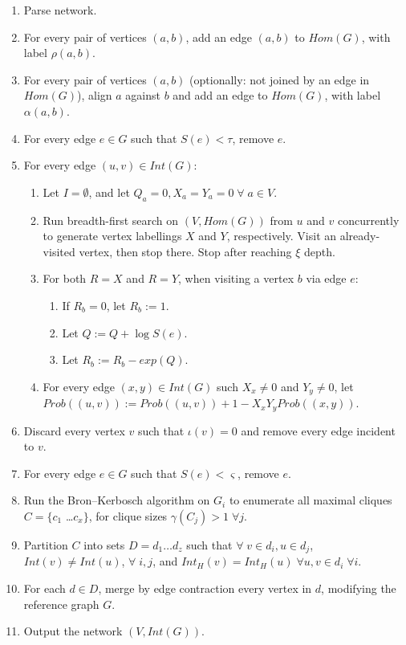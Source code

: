 \documentclass[12pt,twoside]{article}
\def\NS{
	\setlength{\itemsep}{0.1em}
	\setlength{\parskip}{0em}
	\setlength{\parsep}{0em}
}
\begin{document}
\begin{enumerate}
\NS
\item Parse network.
\item For every pair of vertices $(a,b)$, add an edge $(a,b)$ to $Hom(G)$, with label $\rho(a,b)$.
\item For every pair of vertices $(a,b)$ (optionally: not joined by an edge in $Hom(G)$), align $a$ against $b$ and add an edge to $Hom(G)$, with label $\alpha(a,b)$.
\item For every edge $e \in G$ such that $S(e) < \tau$, remove $e$.
\item For every edge $(u,v) \in Int(G)$:
\begin{enumerate}
\item Let $I=\emptyset$, and let $Q_a = 0, X_a = Y_a = 0 \; \forall \; a \in V$.
\item Run breadth-first search on $(V, Hom(G))$ from $u$ and $v$ concurrently to generate vertex labellings $X$ and $Y$, respectively. Visit an already-visited vertex, then stop there. Stop after reaching $\xi$ depth.
\item For both $R=X$ and $R=Y$, when visiting a vertex $b$ via edge $e$:
\begin{enumerate}
\item If $R_b=0$, let $R_b := 1$.
\item Let $Q := Q + \log S(e)$.
\item Let $R_b := R_b - exp(Q)$.
\end{enumerate}
\item For every edge $(x,y) \in Int(G)$ such $X_x \neq 0$ and $Y_y \neq 0$, let $Prob((u,v)) := Prob((u,v)) + 1 - X_x Y_y Prob((x,y))$.
\end{enumerate}
\item Discard every vertex $v$ such that $\iota(v) = 0$ and remove every edge incident to $v$.
\item For every edge $e \in G$ such that $S(e) < \varsigma$, remove $e$.
\item Run the Bron--Kerbosch algorithm on $G_i$ to enumerate all maximal cliques $C = \{ c_1$ \ldots $c_x \}$, for clique sizes $\gamma(C_j) > 1 \; \forall j$.
\item Partition $C$ into sets $D = d_1 \ldots d_z$ such that $\forall \; v \in d_i, u \in d_j$, $Int(v) \neq Int(u)$, $\forall \; i,j$, and $Int_H(v) = Int_H(u) \; \forall u,v \in d_i \; \forall i$.
\item For each $d \in D$, merge by edge contraction every vertex in $d$, modifying the reference graph $G$.
\item Output the network $(V, Int(G))$.
\end{enumerate}
\end{document}
